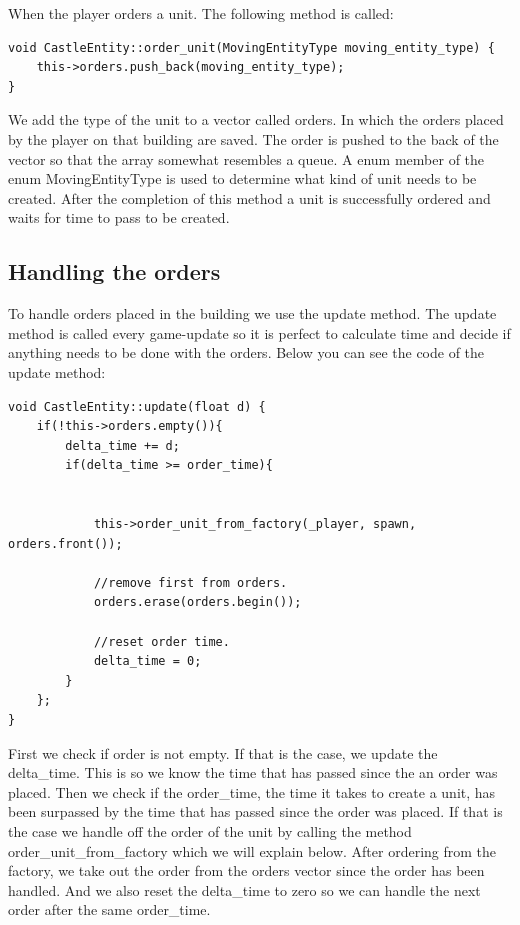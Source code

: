 When the player orders a unit. The following method is called:

\begin{lstlisting}
void CastleEntity::order_unit(MovingEntityType moving_entity_type) {
    this->orders.push_back(moving_entity_type);
}
\end{lstlisting}

We add the type of the unit to a vector called orders. In which the orders placed by the player on that building are saved. The order is pushed to the back of the vector so that the array somewhat resembles a queue. A enum member of the enum MovingEntityType is used to determine what kind of unit needs to be created. After the completion of this method a unit is successfully ordered and waits for time to pass to be created.

\subsection{Handling the orders}
To handle orders placed in the building we use the update method. The update method is called every game-update so it is perfect to calculate time and decide if anything needs to be done with the orders. Below you can see the code of the update method:


\begin{lstlisting}
void CastleEntity::update(float d) {
    if(!this->orders.empty()){
        delta_time += d;
        if(delta_time >= order_time){


            this->order_unit_from_factory(_player, spawn, orders.front());

            //remove first from orders.
            orders.erase(orders.begin());
 
            //reset order time.
            delta_time = 0;
        }
    };
}
\end{lstlisting}

First we check if order is not empty. If that is the case, we update the delta\_time. This is so we know the time that has passed since the an order was placed. Then we check if the order\_time, the time it takes to create a unit, has been surpassed by the time that has passed since the order was placed. If that is the case we handle off the order of the unit by calling the method order\_unit\_from\_factory which we will explain below. After ordering from the factory, we take out the order from the orders vector since the order has been handled. And we also reset the delta\_time to zero so we can handle the next order after the same order\_time.

